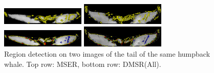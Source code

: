 \documentclass{article}
\begin{document}
\begin{figure}[htb]

\begin{minipage}[b]{.48\linewidth}
  \centering
  \centerline{\includegraphics[width=4cm]{./Figs/mserTailA}}
\end{minipage}
\begin{minipage}[b]{0.51\linewidth}
  \centering
  \centerline{\includegraphics[width=4cm]{./Figs/mserTailB}}
\end{minipage}
\hfill
\begin{minipage}[b]{.48\linewidth}
  \centering
  \centerline{\includegraphics[width=4cm]{./Figs/dmsrTailA}}
\end{minipage}
\begin{minipage}[b]{0.51\linewidth}
  \centering
  \centerline{\includegraphics[width=4cm]{./Figs/dmsrTailB}}
\end{minipage}
\hfill
\vspace{-0.4cm}
\caption{Region detection on two images of the tail of the same humpback whale. 
Top row: MSER, bottom row: DMSR(All).}
\label{fig:tails}
\vspace{-0.3cm}
\end{figure}
\end{document}
